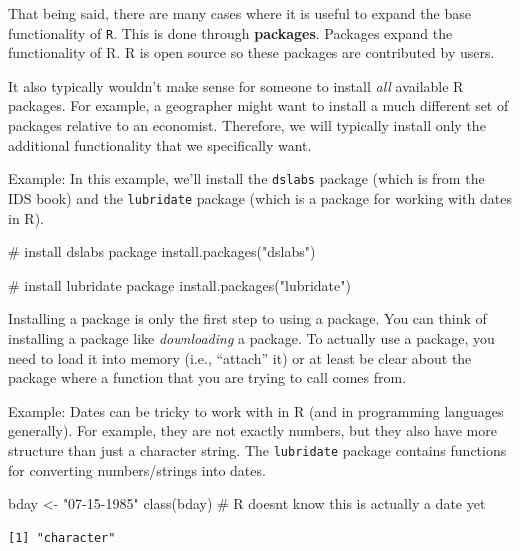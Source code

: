 \documentclass[
  letterpaper,
  DIV=11,
  numbers=noendperiod]{scrreprt}
\newenvironment{Shaded}{\begin{snugshade}}{\end{snugshade}}
\newcommand{\CommentTok}[1]{\textcolor[rgb]{0.37,0.37,0.37}{#1}}
\newcommand{\FunctionTok}[1]{\textcolor[rgb]{0.28,0.35,0.67}{#1}}
\newcommand{\NormalTok}[1]{\textcolor[rgb]{0.00,0.23,0.31}{#1}}
\newcommand{\OtherTok}[1]{\textcolor[rgb]{0.00,0.23,0.31}{#1}}
\newcommand{\StringTok}[1]{\textcolor[rgb]{0.13,0.47,0.30}{#1}}
\begin{document}
That being said, there are many cases where it is useful to expand the
base functionality of \texttt{R}. This is done through
\textbf{packages}. Packages expand the functionality of R. R is open
source so these packages are contributed by users.

It also typically wouldn't make sense for someone to install \emph{all}
available R packages. For example, a geographer might want to install a
much different set of packages relative to an economist. Therefore, we
will typically install only the additional functionality that we
specifically want.

{Example: }In this example, we'll install the \texttt{dslabs} package
(which is from the IDS book) and the \texttt{lubridate} package (which
is a package for working with dates in R).

\begin{Shaded}
\begin{Highlighting}[]
\CommentTok{\# install dslabs package}
\FunctionTok{install.packages}\NormalTok{(}\StringTok{"dslabs"}\NormalTok{)}

\CommentTok{\# install lubridate package}
\FunctionTok{install.packages}\NormalTok{(}\StringTok{"lubridate"}\NormalTok{)}
\end{Highlighting}
\end{Shaded}

Installing a package is only the first step to using a package. You can
think of installing a package like \emph{downloading} a package. To
actually use a package, you need to load it into memory (i.e.,
``attach'' it) or at least be clear about the package where a function
that you are trying to call comes from.

{Example: } Dates can be tricky to work with in R (and in programming
languages generally). For example, they are not exactly numbers, but
they also have more structure than just a character string. The
\texttt{lubridate} package contains functions for converting
numbers/strings into dates.

\begin{Shaded}
\begin{Highlighting}[]
\NormalTok{bday }\OtherTok{\textless{}{-}} \StringTok{"07{-}15{-}1985"}
\FunctionTok{class}\NormalTok{(bday) }\CommentTok{\# R doesn\textquotesingle{}t know this is actually a date yet}
\end{Highlighting}
\end{Shaded}

\begin{verbatim}
[1] "character"
\end{verbatim}
\end{document}
